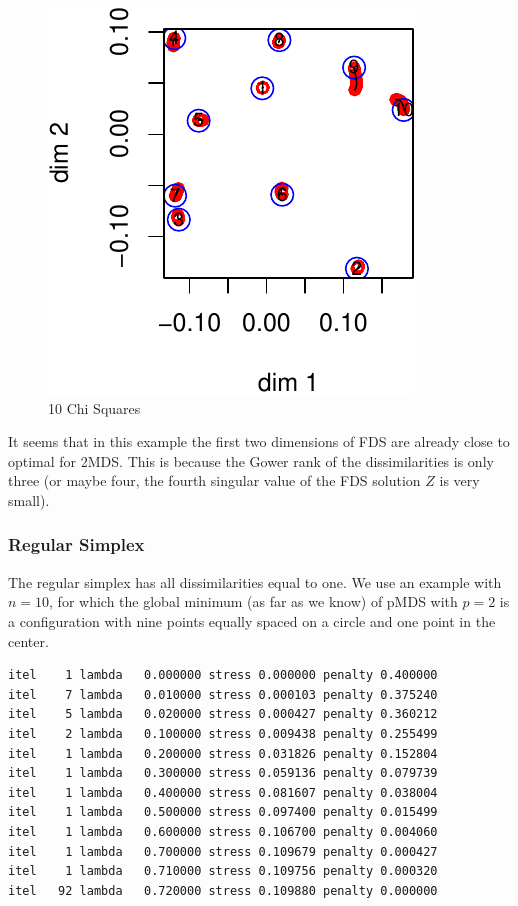\documentclass[
  12pt,
  letterpaper,
  DIV=11,
  numbers=noendperiod]{scrreprt}
\theoremstyle{remark}
\begin{document}
\begin{figure}[H]

{\centering \includegraphics{global_files/figure-pdf/chi-1.pdf}

}

\caption{10 Chi Squares}

\end{figure}%

It seems that in this example the first two dimensions of FDS are
already close to optimal for 2MDS. This is because the Gower rank of the
dissimilarities is only three (or maybe four, the fourth singular value
of the FDS solution \(Z\) is very small).

\subsubsection{Regular Simplex}\label{regular-simplex}

The regular simplex has all dissimilarities equal to one. We use an
example with \(n=10\), for which the global minimum (as far as we know)
of pMDS with \(p=2\) is a configuration with nine points equally spaced
on a circle and one point in the center.

\begin{verbatim}
itel    1 lambda   0.000000 stress 0.000000 penalty 0.400000 
itel    7 lambda   0.010000 stress 0.000103 penalty 0.375240 
itel    5 lambda   0.020000 stress 0.000427 penalty 0.360212 
itel    2 lambda   0.100000 stress 0.009438 penalty 0.255499 
itel    1 lambda   0.200000 stress 0.031826 penalty 0.152804 
itel    1 lambda   0.300000 stress 0.059136 penalty 0.079739 
itel    1 lambda   0.400000 stress 0.081607 penalty 0.038004 
itel    1 lambda   0.500000 stress 0.097400 penalty 0.015499 
itel    1 lambda   0.600000 stress 0.106700 penalty 0.004060 
itel    1 lambda   0.700000 stress 0.109679 penalty 0.000427 
itel    1 lambda   0.710000 stress 0.109756 penalty 0.000320 
itel   92 lambda   0.720000 stress 0.109880 penalty 0.000000 
\end{verbatim}
\end{document}
